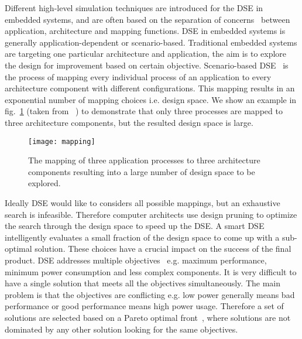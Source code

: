 \documentclass{article}
\begin{document}
Different high-level simulation techniques are introduced for the DSE in
embedded systems, and are often based on the separation of
concerns~\cite{Keutzer00system-leveldesign:} between application, architecture
and mapping functions. DSE in embedded systems is generally
application-dependent or scenario-based. Traditional embedded systems are
targeting one particular architecture and application, the aim is to explore
the design for improvement based on certain objective. Scenario-based
DSE~\cite{5647727} is the process of mapping every individual process of an
application to every architecture component with different configurations. This
mapping results in an exponential number of mapping choices i.e. design
space. We show an example in fig.~\ref{fig:mapping} (taken from
~\cite{Jaddoe:2008:SCA:1427510.1427549}) to demonstrate that only three
processes are mapped to three architecture components, but the resulted design
space is large.

\begin{figure}

\begin{centering}

\texttt{[image: mapping]}

\caption{\label{fig:mapping}The mapping of three application
processes to three architecture components resulting into a large
number of design space to be explored.}

\end{centering}

\end{figure}

Ideally DSE would like to considers all possible mappings, but an exhaustive
search is infeasible. Therefore computer architects use design pruning to
optimize the search through the design space to speed up the DSE. A smart DSE
intelligently evaluates a small fraction of the design space to come up with a
sub-optimal solution. These choices have a crucial impact on the success of the
final product. DSE addresses multiple
objectives~\cite{Erbas:2003:MOM:944645.944693} e.g. maximum performance,
minimum power consumption and less complex components. It is very difficult to
have a single solution that meets all the objectives simultaneously. The main
problem is that the objectives are conflicting e.g. low power generally means bad
performance or good performance means high power usage. Therefore a set of
solutions are selected based on a Pareto optimal front~\cite{Abido200397}, where
solutions are not dominated by any other solution looking for the same objectives.
\end{document}
